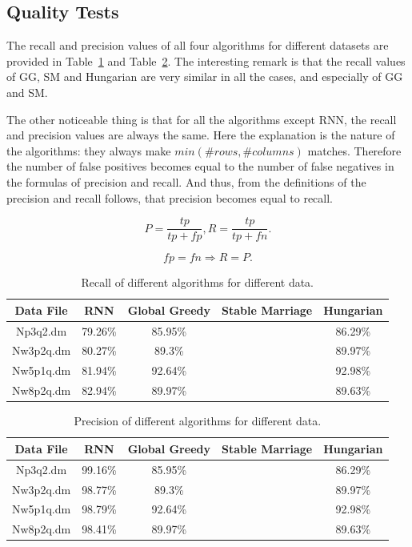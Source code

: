 \documentclass[a4paper,11pt]{article}
\begin{document}
\subsection{Quality Tests}

The recall and precision values of all four algorithms for different datasets are provided in Table~\ref{recall} and Table~\ref{precision}. The interesting remark is that the recall values of GG, SM and Hungarian are very similar in all the cases, and especially of GG and SM. %

The other noticeable thing is that for all the algorithms except RNN, the recall and precision values are always the same. Here the explanation is the nature of the algorithms: they always make $min(\#rows, \#columns)$ matches. Therefore the number of false positives becomes equal to the number of false negatives in the formulas of precision and recall. And thus, from the definitions of the precision and recall follows, that precision becomes equal to recall.


\[P = \frac{tp}{tp+fp}, R = \frac{tp}{tp+fn}.\]

\[fp=fn \Rightarrow R=P.\]

\begin{table}[tbh]
\centering
\begin{tabular}{|c|c|c|c|c|}
\hline 
Data File & RNN & Global Greedy & Stable Marriage & Hungarian \tabularnewline
\hline 
\hline 
 Np3q2.dm & 79.26\% & 85.95\% &  & 86.29\%\tabularnewline
\hline
 Nw3p2q.dm & 80.27\% & 89.3\% &  & 89.97\%\tabularnewline
\hline 
 Nw5p1q.dm & 81.94\% & 92.64\% &  & 92.98\%\tabularnewline
\hline 
 Nw8p2q.dm & 82.94\% & 89.97\% &  & 89.63\%\tabularnewline
\hline
\end{tabular}
\caption{Recall of different algorithms for different data.}
\label{recall}
\end{table}

\begin{table}[tbh]
\centering
\begin{tabular}{|c|c|c|c|c|}
\hline 
Data File & RNN & Global Greedy & Stable Marriage & Hungarian \tabularnewline
\hline 
\hline 
 Np3q2.dm & 99.16\% & 85.95\% &  & 86.29\%\tabularnewline
\hline
 Nw3p2q.dm & 98.77\% & 89.3\% &  & 89.97\%\tabularnewline
\hline 
 Nw5p1q.dm & 98.79\% & 92.64\% &  & 92.98\%\tabularnewline
\hline 
 Nw8p2q.dm & 98.41\% & 89.97\% &  & 89.63\%\tabularnewline
\hline
\end{tabular}
\caption{Precision of different algorithms for different data.}
\label{precision}
\end{table}
\end{document}
